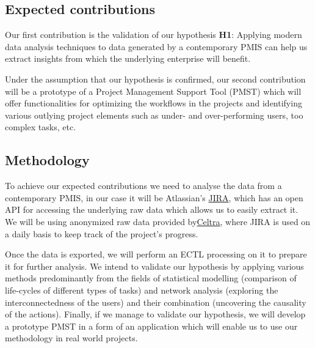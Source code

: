 \documentclass[a4paper, 12pt]{article}
\begin{document}
\subsection{Expected contributions}


Our first contribution is the validation of our hypothesis \textbf{H1}: Applying modern data analysis techniques to data generated by a contemporary PMIS can help us extract insights from which the underlying enterprise will benefit. 

Under the assumption that our hypothesis is confirmed, our second contribution will be a prototype of a Project Management Support Tool (PMST) which will offer functionalities for optimizing the workflows in the projects and identifying various outlying project elements such as under- and over-performing users, too complex tasks, etc.

\subsection{Methodology}


To achieve our expected contributions we need to analyse the data from a contemporary PMIS, in our case it will be Atlassian's \href{https://www.atlassian.com/software/jira}{JIRA}, which has an open API for accessing the underlying raw data which allows us to easily extract it. We will be using anonymized raw data provided by\href{https://www.celtra.com/}{Celtra}, where JIRA is used on a daily basis to keep track of the project's progress.

Once the data is exported, we will perform an ECTL processing on it to prepare it for further analysis. We intend to validate our hypothesis by applying various methods predominantly from the fields of statistical modelling (comparison of life-cycles of different types of tasks) and network analysis (exploring the interconnectedness of the users) and their combination (uncovering the causality of the actions). Finally, if we manage to validate our hypothesis, we will develop a prototype PMST in a form of an application which will enable us to use our methodology in real world projects.
\end{document}
